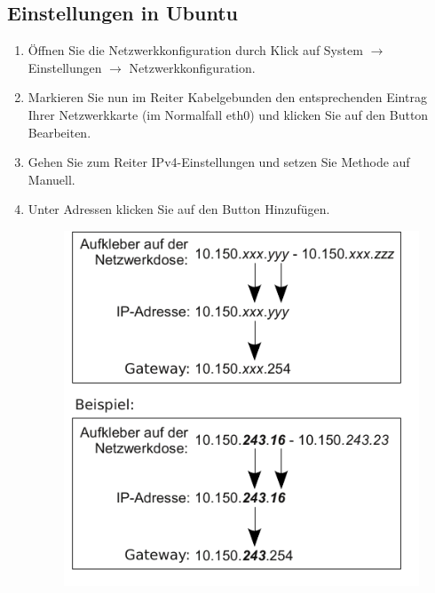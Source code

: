 \documentclass[a4paper,12pt,draft]{scrartcl}
\begin{document}
\subsection*{Einstellungen in Ubuntu}
\begin{enumerate}
    \item Öffnen Sie die Netzwerkkonfiguration durch Klick auf System $\rightarrow$ Einstellungen $\rightarrow$ Netzwerkkonfiguration.
    \item Markieren Sie nun im Reiter Kabelgebunden den entsprechenden Eintrag Ihrer Netzwerkkarte (im Normalfall eth0) und klicken Sie auf den Button Bearbeiten.
    \item Gehen Sie zum Reiter IPv4-Einstellungen und setzen Sie Methode auf Manuell.
    \item Unter Adressen klicken Sie auf den Button Hinzufügen.
      \begin{figure}[h!]
        \centering
        \begin{minipage}[c]{0.45\linewidth}
          \centering
          \includegraphics[width=\linewidth,keepaspectratio]{Bilder/IP_Gerneric}
        \end{minipage}
        \begin{minipage}[c]{0.5\linewidth}
          \centering

\end{minipage}
\end{figure}
\end{enumerate}
\end{document}
